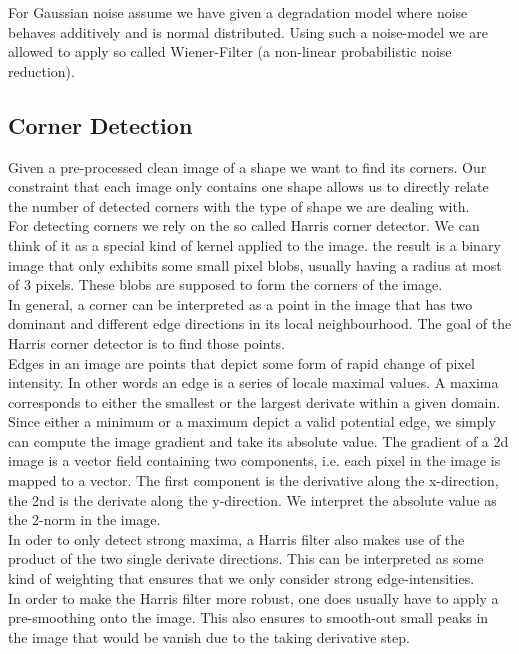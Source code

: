\documentclass[conference]{IEEEtran}
\begin{document}
For Gaussian noise assume we have given a degradation model where noise behaves additively and is normal distributed. Using such a noise-model we are allowed to apply so called Wiener-Filter (a non-linear probabilistic noise reduction). 

\subsection{Corner Detection}
\label{sub:corner_detection}
Given a pre-processed clean image of a shape we want to find its corners. Our constraint that each image only contains one shape allows us to directly relate the number of detected corners with the type of shape we are dealing with. \\

For detecting corners we rely on the so called Harris corner detector. We can think of it as a special kind of kernel applied to the image. the result is a binary image that only exhibits some small pixel blobs, usually having a radius at most of 3 pixels. These blobs are supposed to form the corners of the image. \\ 

In general, a corner can be interpreted as a point in the image that has two dominant and different edge directions in its local neighbourhood. The goal of the Harris corner detector is to find those points. \\

Edges in an image are points that depict some form of rapid change of pixel intensity. In other words an edge is a series of locale maximal values. A maxima corresponds to either the smallest or the largest derivate within a given domain. Since either a minimum or a maximum depict a valid potential edge, we simply can compute the image gradient and take its absolute value. The gradient of a 2d image is a vector field containing two components, i.e. each pixel in the image is mapped to a vector. The first component is the derivative along the x-direction, the 2nd is the derivate along the y-direction. We interpret the absolute value as the 2-norm in the image. \\

In oder to only detect strong maxima, a Harris filter also makes use of the product of the two single derivate directions. This can be interpreted as some kind of weighting that ensures that we only consider strong edge-intensities. \\

In order to make the Harris filter more robust, one does usually have to apply a pre-smoothing onto the image. This also ensures to smooth-out small peaks in the image that would be vanish due to the taking derivative step. \\
\end{document}
